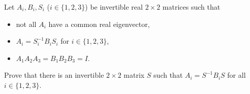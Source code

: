Let \(A_{i},B_{i},S_{i}\) (\(i\in\{1,2,3\}\)) be invertible real \(2\times 2\) matrices such that
\begin{itemize}
	\item not all \(A_{i}\) have a common real eigenvector,
	\item \(A_{i}=S_{i}^{-1}B_{i}S_{i}\) for \(i\in\{1,2,3\}\),
	\item \(A_{1}A_{2}A_{3}=B_{1}B_{2}B_{3}=I\).
\end{itemize}
Prove that there is an invertible \(2\times 2\) matrix \(S\) such that \(A_{i}=S^{-1}B_{i}S\) for all \(i\in\{1,2,3\}\).